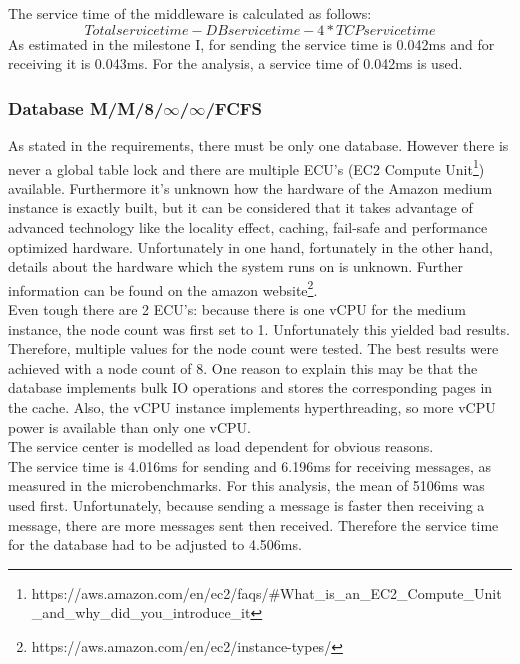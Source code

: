 \documentclass[a4paper]{article}
\begin{document}
The service time of the middleware is calculated as follows:
$$Total service time - DB service time - 4 * TCP service time$$
As estimated in the milestone I\cite{milestone1}, for sending the service time is 0.042ms and for receiving it is 0.043ms. For the analysis, a service time of 0.042ms is used.\\


\subsubsection{Database M/M/8/$\infty$/$\infty$/FCFS}

As stated in the requirements, there must be only one database. However there is never a global table lock and there are multiple ECU's (EC2 Compute Unit\footnote{https://aws.amazon.com/en/ec2/faqs/\#What\_is\_an\_EC2\_Compute\_Unit\_and\_why\_did\_you\_introduce\_it})  available. Furthermore it's unknown how the hardware of the Amazon medium instance is exactly built, but it can be considered that it takes advantage of advanced technology like the locality effect, caching, fail-safe and performance optimized hardware. Unfortunately in one hand, fortunately in the other hand, details about the hardware which the system runs on is unknown. Further information can be found on the amazon website\footnote{https://aws.amazon.com/en/ec2/instance-types/}.\\

Even tough there are 2 ECU's: because there is one vCPU for the medium instance, the node count was first set to 1. Unfortunately this yielded bad results. Therefore, multiple values for the node count were tested. The best results were achieved with a node count of 8. One reason to explain this may be that the database implements bulk IO operations and stores the corresponding pages in the cache. Also, the vCPU instance implements hyperthreading, so more vCPU power is available than only one vCPU.\\

The service center is modelled as load dependent for obvious reasons.\\

The service time is 4.016ms for sending and 6.196ms for receiving messages, as measured in the microbenchmarks. For this analysis, the mean of 5106ms was used first. Unfortunately, because sending a message is faster then receiving a message, there are more messages sent then received. Therefore the service time for the database had to be adjusted to 4.506ms.\\
\end{document}
